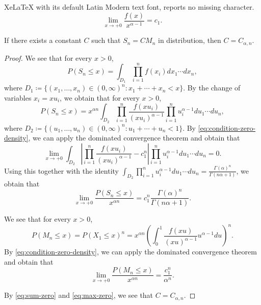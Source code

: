 \documentclass[10pt,a4paper]{amsart}
\begin{document}
XeLaTeX with its default Latin Modern text font, reports no missing character.
\begin{equation}\label{eq:condition-zero-density} 
\lim_{x \to +0} \frac{f(x)}{x^{\alpha-1}} = c_1.  
\end{equation}  

\begin{Lem}\label{lem:const-unique-zero}
If there exists a constant $C$ such that $S_n = CM_n$ in distribution, 
then $C = C_{\alpha,n}$. 
\end{Lem}

\begin{proof}
We see that for every $x > 0$, 
\[ P(S_n \le x) = \int_{D_1} \prod_{i=1}^{n} f(x_i) dx_1 \cdots dx_{n},  \]
where $D_1 \coloneqq \{(x_1, \dots, x_n) \in (0,\infty)^n \colon x_1 + \cdots + x_n < x \}$. 
By the change of variables $x_i = x u_i$, 
we obtain that for every $x > 0$, 
\[ P(S_n \le x) = x^{\alpha n} \int_{D_2} \prod_{i=1}^{n} \frac{f(x u_i)}{(x u_i)^{\alpha -1}} \prod_{i=1}^{n} u_i^{\alpha -1} du_1 \cdots du_{n},  \]
where $D_2 \coloneqq \{(u_1, \dots, u_n) \in (0,\infty)^n \colon u_1 + \cdots + u_n < 1 \}$. 
By \eqref{eq:condition-zero-density}, 
we can apply the dominated convergence theorem and obtain that 
\[ \lim_{x \to +0} \int_{D_2} \left| \prod_{i=1}^{n} \frac{f(x u_i)}{(x u_i)^{\alpha -1}}  - c_1^n \right|  \prod_{i=1}^{n} u_i^{\alpha -1} du_1 \cdots du_{n} = 0. \]
Using this together with the identity $\int_{D_2}  \prod_{i=1}^{n} u_i^{\alpha -1} du_1 \cdots du_{n} = \frac{\Gamma(\alpha)^n}{\Gamma(n \alpha +1)}$, 
we obtain that 
\begin{equation}\label{eq:sum-zero}
\lim_{x \to +0} \frac{P(S_n \le x)}{x^{\alpha n}}  = c_1^n \frac{\Gamma(\alpha)^n}{\Gamma(n \alpha +1)}. 
\end{equation} 

We see that for every $x > 0$, 
\[ P(M_n \le x) = P(X_1 \le x)^n =  x^{\alpha n} \left(\int_0^1 \frac{f(xu)}{(xu)^{\alpha-1}} u^{\alpha-1} du \right)^n.  \]
By \eqref{eq:condition-zero-density}, 
we can apply the dominated convergence theorem and obtain that 
\begin{equation}\label{eq:max-zero} 
\lim_{x \to +0} \frac{P(M_n \le x)}{x^{\alpha n}}  = \frac{c_1^n}{\alpha^n}. 
\end{equation}

By \eqref{eq:sum-zero} and \eqref{eq:max-zero}, we see that $C = C_{\alpha,n}$. 
\end{proof}
\end{document}
